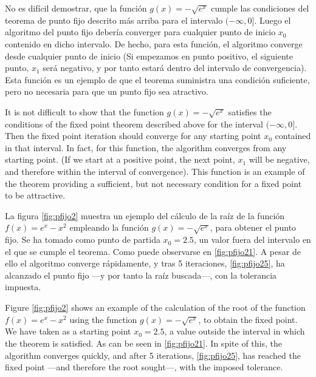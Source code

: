 \begin{paracol}{2}
No es difícil demostrar, que la función $g(x)=-\sqrt{e^x} $ cumple las condiciones del teorema de punto fijo descrito más arriba para el intervalo $(-\infty, 0]$. Luego el algoritmo del punto fijo debería converger para cualquier punto de inicio $x_0$ contenido en dicho intervalo. De hecho, para esta función, el algoritmo converge desde cualquier punto de inicio (Si empezamos en punto positivo, el siguiente punto, $x_1$ será negativo, y por tanto estará dentro del intervalo de convergencia). Esta función es un ejemplo de que el teorema suministra una condición suficiente, pero no necesaria para que un punto fijo sea atractivo. 
\switchcolumn

It is not difficult to show that the function $g(x)=-\sqrt{e^x}$ satisfies the conditions of the fixed point theorem described above for the interval $(-\infty, 0]$. Then the fixed point iteration should converge for any starting point $x_0$ contained in that interval. In fact, for this function, the algorithm converges from any starting point. (If we start at a positive point, the next point, $x_1$ will be negative, and therefore within the interval of convergence). This function is an example of the theorem providing a sufficient, but not necessary condition for a fixed point to be attractive. 

\switchcolumn

La figura \ref{fig:pfijo2} muestra un ejemplo del cálculo de la raíz de la función $f(x)=e^x-x^2$ empleando la función $g(x)=-\sqrt{e^x}$, para obtener el punto fijo. Se ha tomado como punto de partida $x_0=2.5$, un valor fuera del intervalo en el que se cumple el teorema. Como puede observarse en \ref{fig:pfijo21}. A pesar de ello el algoritmo converge rápidamente, y tras 5 iteraciones, \ref{fig:pfijo25}, ha alcanzado el punto fijo ---y por tanto la raíz buscada---, con la tolerancia impuesta.

\switchcolumn

Figure \ref{fig:pfijo2} shows an example of the calculation of the root of the function $f(x)=e^x-x^2$ using the function $g(x)=-\sqrt{e^x}$, to obtain the fixed point. We have taken as a starting point $x_0=2.5$, a value outside the interval in which the theorem is satisfied. As can be seen in \ref{fig:pfijo21}. In spite of this, the algorithm converges quickly, and after 5 iterations, \ref{fig:pfijo25}, has reached the fixed point ---and therefore the root sought---, with the imposed tolerance.

\end{paracol}


